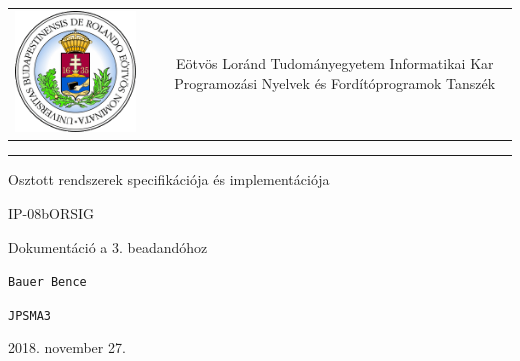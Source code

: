 \documentclass[12pt]{article}
\begin{document}
\def\br{\\[0.2cm]}
\begin{titlepage}
	\vspace*{0cm}
	\centering
	\begin{tabular}{cp{1cm}c}
		\begin{minipage}{4cm}
			\vspace{0pt}
			\includegraphics[width=1\textwidth]{elte_cimer}
		\end{minipage} & &
		\begin{minipage}{7cm}
			\vspace{0pt}Eötvös Loránd Tudományegyetem \vspace{10pt} \newline
			Informatikai Kar \vspace{10pt} \newline
			Programozási Nyelvek és Fordítóprogramok Tanszék
		\end{minipage}
	\end{tabular}
	
	\vspace*{0.2cm}
	\rule{\textwidth}{1pt}
	
	\vspace*{3cm}
	{\Huge Osztott rendszerek specifikációja és implementációja }
	
	\vspace*{0.5cm}
	{\normalsize IP-08bORSIG}
	
	\vspace{2cm}
	{\huge Dokumentáció a 3. beadandóhoz}
	
	\vspace*{5cm}
	
	{\large \verb|Bauer Bence| }
	
	{\large \verb|JPSMA3| }
		
	
	\vfill
	
	\vspace*{1cm}
	2018. november 27.
\end{titlepage}
\end{document}
